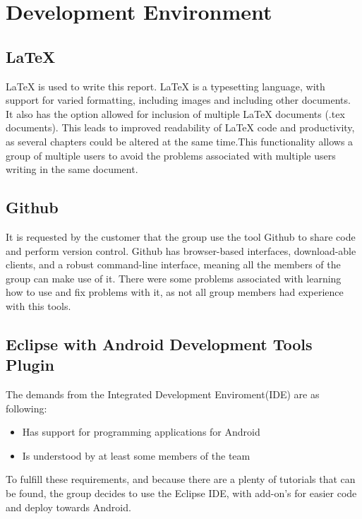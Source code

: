 \chapter{Development Environment}

\section{LaTeX}
LaTeX is used to write this report. LaTeX is a typesetting language, with support for varied formatting, including images and including other documents. It also has the option allowed for inclusion of multiple LaTeX documents (.tex documents). This leads to improved readability of LaTeX code and productivity, as several chapters could be altered at the same time.This functionality allows a group of multiple users to avoid the problems associated with multiple users writing in the same document.
\section{Github}

\label{def:githubDev}It is requested by the customer that the group use the tool Github to share code and perform version control. Github has browser-based interfaces, download-able clients, and a robust command-line interface, meaning all the members of the group can make use of it. There were some problems associated with learning how to use and fix problems with it, as not all group members had experience with this tools. 

\section{Eclipse with Android Development Tools Plugin}
The demands from the Integrated Development Enviroment(IDE) are as following:
\begin{itemize}
\item Has support for programming applications for Android
\item Is understood by at least some members of the team
\end{itemize}
To fulfill these requirements, and because there are a plenty of tutorials that can be found, the group decides to use the Eclipse IDE, with add-on's for easier code and deploy towards Android. 


 
